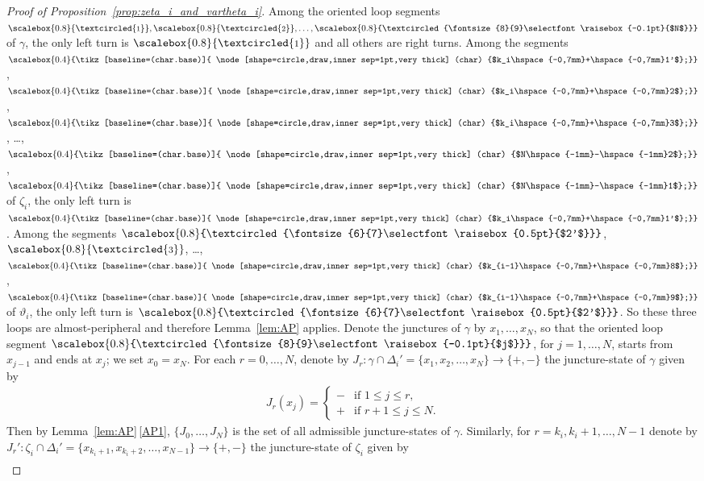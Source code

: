 \documentclass[10pt,a4paper]{amsart}
\numberwithin{equation}{section}
\theoremstyle{definition}
\newcommand{\circled}[1]{\scalebox{0.8}{\textcircled{\fontsize{8}{9}\selectfont \raisebox{-0.1pt}{#1}}}}
\newcommand{\circledd}[1]{\scalebox{0.8}{\textcircled{\fontsize{6}{7}\selectfont \raisebox{0.5pt}{#1}}}}
\newcommand*\circleddd[1]{\scalebox{0.4}{\tikz[baseline=(char.base)]{
 \node[shape=circle,draw,inner sep=1pt,very thick] (char) {#1};}}}
\begin{document}
\begin{proof}[Proof of Proposition~\ref{prop:zeta_i_and_vartheta_i}] Among the oriented loop segments $\circled{1},\circled{2},\dots,\circled{$N$}$ of $\gamma$, the only left turn is $\circled{1}$ and all others are right turns. Among the segments $\circleddd{$k_i\hspace{-0,7mm}+\hspace{-0,7mm}1'$}$, $\circleddd{$k_i\hspace{-0,7mm}+\hspace{-0,7mm}2$}$, $\circleddd{$k_i\hspace{-0,7mm}+\hspace{-0,7mm}3$}$, \dots, $\circleddd{$N\hspace{-1mm}-\hspace{-1mm}2$}$, $\circleddd{$N\hspace{-1mm}-\hspace{-1mm}1$}$ of $\zeta_i$, the only left turn is $\circleddd{$k_i\hspace{-0,7mm}+\hspace{-0,7mm}1'$}$. Among the segments $\circledd{$2'$}$, $\circled{3}$, \dots, $\circleddd{$k_{i-1}\hspace{-0,7mm}+\hspace{-0,7mm}8$}$, $\circleddd{$k_{i-1}\hspace{-0,7mm}+\hspace{-0,7mm}9$}$ of $\vartheta_i$, the only left turn is $\circledd{$2'$}$. So these three loops are almost-peripheral and therefore Lemma~\ref{lem:AP} applies. Denote the junctures of $\gamma$ by $x_1, \dots,x_N$, so that the oriented loop segment $\circled{$j$}$, for $j=1,\dots,N$, starts from $x_{j-1}$ and ends at $x_j$; we set $x_0=x_N$. For each $r=0,\dots,N$, denote by $J_r : \gamma \cap \Delta_i' = \{x_1,x_2,\dots,x_N\} \to \{+,-\}$ the juncture-state of $\gamma$ given by
\begin{align*}
J_r(x_j) = \begin{cases}
- & \mbox{if $1\le j \le r$}, \\
+ & \mbox{if $r+1 \le j \le N$}.
\end{cases}
\end{align*}
Then by Lemma~\ref{lem:AP}\,\ref{AP1}, $\{J_0,\dots,J_N\}$ is the set of all admissible juncture-states of $\gamma$. Similarly, for $r=k_i,k_i+1,\dots,N-1$ denote by $J_r' \colon \zeta_i \cap \Delta_i' = \{x_{k_i+1},x_{k_i+2},\dots,x_{N-1}\} \to \{+,-\}$ the juncture-state of $\zeta_i$ given by
\begin{align*}

\end{align*}
\end{proof}
\end{document}
